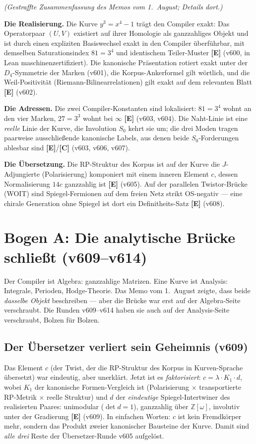 \documentclass[11pt,a4paper]{article}
\newcommand{\E}{\textcolor{gut}{\textbf{[E]}}}
\newcommand{\C}{\textcolor{kern}{\textbf{[C]}}}
\begin{document}
\emph{(Gestraffte Zusammenfassung des Memos vom 1.~August; Details
dort.)}

\textbf{Die Realisierung.} Die Kurve $y^3 = x^4 - 1$ trägt den
Compiler exakt: Das Operatorpaar $(U, V)$ existiert auf ihrer
Homologie als ganzzahliges Objekt und ist durch einen expliziten
Basiswechsel exakt in den Compiler überführbar, mit demselben
Saturationsindex $81 = 3^4$ und identischem Teiler-Muster \E{} (v600,
in Lean maschinenzertifiziert). Die kanonische Präsentation rotiert
exakt unter der $D_4$-Symmetrie der Marken (v601), die
Korpus-Ankerformel gilt wörtlich, und die Weil-Positivität
(Riemann-Bilinearrelationen) gilt exakt auf dem relevanten Blatt \E{}
(v602).

\textbf{Die Adressen.} Die zwei Compiler-Konstanten sind lokalisiert:
$81 = 3^4$ wohnt an den vier Marken, $27 = 3^3$ wohnt bei $\infty$
\E{} (v603, v604). Die Naht-Linie ist eine \emph{reelle} Linie der
Kurve, die Involution $S_0$ kehrt sie um; die drei Moden tragen
paarweise ausschließende kanonische Labels, aus denen beide
$S_0$-Forderungen ablesbar sind \E{}/\C{} (v603, v606, v607).

\textbf{Die Übersetzung.} Die RP-Struktur des Korpus ist auf der
Kurve die $J$-Adjungierte (Polarisierung) komponiert mit einem inneren
Element $c$, dessen Normalisierung $14c$ ganzzahlig ist \E{} (v605).
Auf der parallelen Twistor-Brücke (WOIT) sind Spiegel-Fermionen auf
dem freien Netz strikt OS-negativ --- \glqq{}eine chirale Generation
ohne Spiegel\grqq{} ist dort ein Definitheits-Satz \E{} (v608).

\section{Bogen A: Die analytische Brücke schließt (v609--v614)}

Der Compiler ist Algebra: ganzzahlige Matrizen. Eine Kurve ist
Analysis: Integrale, Perioden, Hodge-Theorie. Das Memo vom 1.~August
zeigte, dass beide \emph{dasselbe Objekt} beschreiben --- aber die
Brücke war erst auf der Algebra-Seite verschraubt. Die Runden
v609--v614 haben sie auch auf der Analysis-Seite verschraubt, Bolzen
für Bolzen.

\subsection*{Der Übersetzer verliert sein Geheimnis (v609)}

Das Element $c$ (der \glqq{}Twist\grqq{}, der die RP-Struktur des
Korpus in Kurven-Sprache übersetzt) war eindeutig, aber unerklärt.
Jetzt ist es \emph{faktorisiert}: $c = \lambda \cdot K_1 \cdot d$,
wobei $K_1$ der kanonische Formen-Vergleich ist (Polarisierung
$\times$ transportierte RP-Metrik $\times$ reelle Struktur) und $d$
der \emph{eindeutige} Spiegel-Intertwiner des realisierten Paares:
unimodular ($\det d = 1$), ganzzahlig über $\mathbb{Z}[\omega]$,
involutiv unter der Gradierung \E{} (v609). In einfachen Worten: $c$
ist kein Fremdkörper mehr, sondern das Produkt zweier kanonischer
Bausteine der Kurve. Damit sind \emph{alle drei} Reste der
Übersetzer-Runde v605 aufgelöst.
\end{document}
